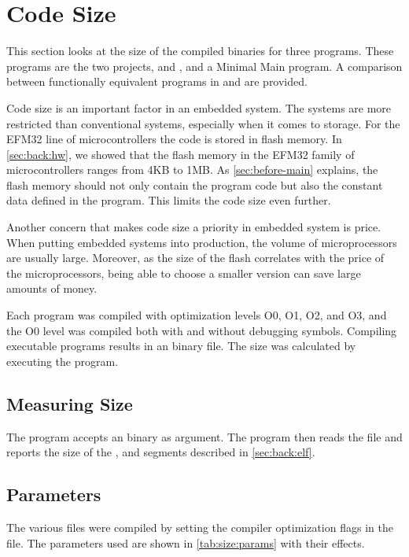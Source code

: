 \section{Code Size}
\label{sec:res:code-size}

This section looks at the size of the compiled binaries for three {\rust} programs.
These programs are the two projects, {\tracker} and {\cg}, and a Minimal Main program.
A comparison between functionally equivalent programs in {\C} and {\rust} are provided.

Code size is an important factor in an embedded system.
The systems are more restricted than conventional systems, especially when it comes to storage.
For the EFM32 line of microcontrollers the code is stored in flash memory.
In \autoref{sec:back:hw}, we showed that the flash memory in the EFM32 family of microcontrollers ranges from 4KB to 1MB.
As \autoref{sec:before-main} explains, the flash memory should not only contain the program code but also the constant data defined in the program.
This limits the code size even further.

Another concern that makes code size a priority in embedded system is price.
When putting embedded systems into production, the volume of microprocessors are usually large.
Moreover, as the size of the flash correlates with the price of the microprocessors, being able to choose a smaller version can save large amounts of money.

Each program was compiled with optimization levels O0, O1, O2, and O3, and the O0 level was compiled both with and without debugging symbols.
Compiling executable programs results in an {\elf} binary file.
The size was calculated by executing the  program.

\subsection{Measuring Size}
\label{sec:measure-size}

The  program accepts an {\elf} binary as argument.
The program then reads the file and reports the size of the ,  and  segments described in \autoref{sec:back:elf}.

\subsection{Parameters}
\label{sec:size:params}
The various files were compiled by setting the compiler optimization flags in the  file.
The parameters used are shown in \autoref{tab:size:params} with their effects.

